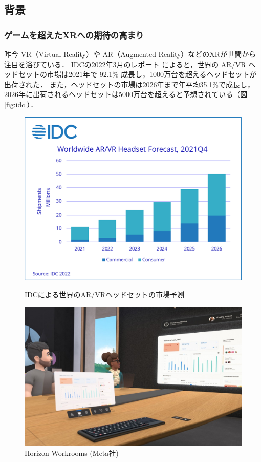 \subsection{背景}

\subsubsection{ゲームを超えたXRへの期待の高まり}

昨今 VR（Virtual Reality）や AR（Augmented Reality）などのXRが世間から注目を浴びている．
IDCの2022年3月のレポート\cite{idc} によると，世界の AR/VR ヘッドセットの市場は2021年で
92.1\% 成長し，1000万台を超えるヘッドセットが出荷された．
また，ヘッドセットの市場は2026年まで年平均35.1\%で成長し，
2026年に出荷されるヘッドセットは5000万台を超えると予想されている（図\ref{fig:idc}）．

\begin{figure}[htbp]
  \begin{minipage}[b]{0.50\linewidth}
    \centering
    \includegraphics[keepaspectratio, width=0.9\linewidth]{fig/idc.png}
    \caption{IDCによる世界のAR/VRヘッドセットの市場予測}
    \label{fig:idc}
  \end{minipage}
  \begin{minipage}[b]{0.50\linewidth}
    \centering
    \includegraphics[keepaspectratio, width=0.9\linewidth]{fig/workrooms.jpeg}
    \caption{Horizon Workrooms (Meta社)}
    \label{fig:workrooms}
  \end{minipage}
\end{figure}

